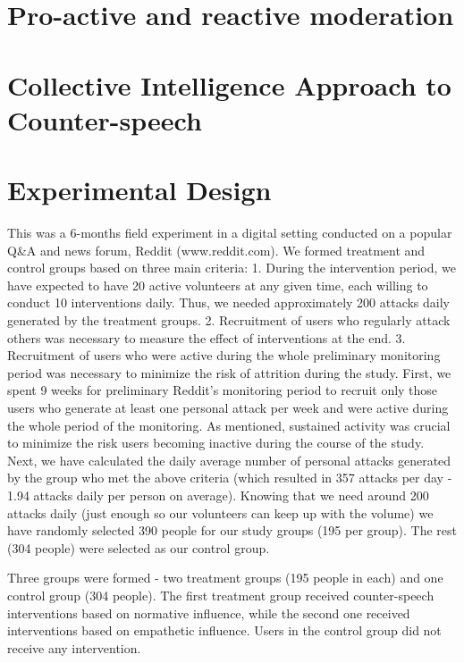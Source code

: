 \documentclass[
  10pt,
  dvipsnames,enabledeprecatedfontcommands]{scrartcl}
\begin{document}
\hypertarget{pro-active-and-reactive-moderation}{%
\section{Pro-active and reactive
moderation}\label{pro-active-and-reactive-moderation}}

\hypertarget{collective-intelligence-approach-to-counter-speech}{%
\section{Collective Intelligence Approach to
Counter-speech}\label{collective-intelligence-approach-to-counter-speech}}

\hypertarget{experimental-design}{%
\section{Experimental Design}\label{experimental-design}}

This was a 6-months field experiment in a digital setting conducted on a
popular Q\&A and news forum, Reddit (www.reddit.com). We formed
treatment and control groups based on three main criteria: 1. During the
intervention period, we have expected to have 20 active volunteers at
any given time, each willing to conduct 10 interventions daily. Thus, we
needed approximately 200 attacks daily generated by the treatment
groups. 2. Recruitment of users who regularly attack others was
necessary to measure the effect of interventions at the end. 3.
Recruitment of users who were active during the whole preliminary
monitoring period was necessary to minimize the risk of attrition during
the study. First, we spent 9 weeks for preliminary Reddit's monitoring
period to recruit only those users who generate at least one personal
attack per week and were active during the whole period of the
monitoring. As mentioned, sustained activity was crucial to minimize the
risk users becoming inactive during the course of the study. Next, we
have calculated the daily average number of personal attacks generated
by the group who met the above criteria (which resulted in 357 attacks
per day - 1.94 attacks daily per person on average). Knowing that we
need around 200 attacks daily (just enough so our volunteers can keep up
with the volume) we have randomly selected 390 people for our study
groups (195 per group). The rest (304 people) were selected as our
control group.

Three groups were formed - two treatment groups (195 people in each) and
one control group (304 people). The first treatment group received
counter-speech interventions based on normative influence, while the
second one received interventions based on empathetic influence. Users
in the control group did not receive any intervention.
\end{document}
